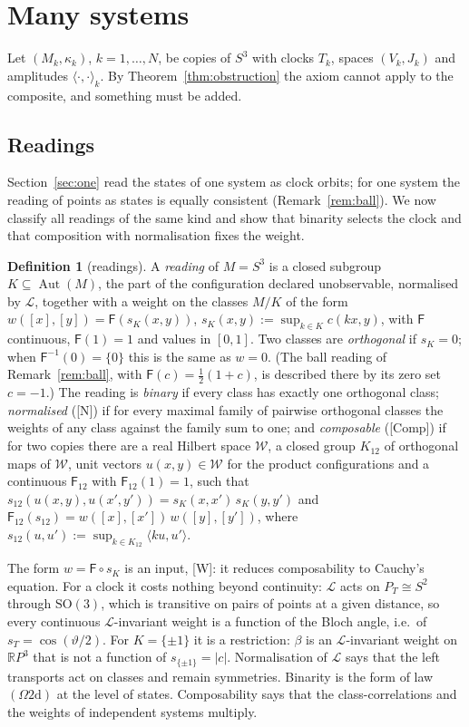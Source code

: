 \documentclass[aps,pra,onecolumn,superscriptaddress,nofootinbib,10pt]{revtex4-2}
\theoremstyle{definition}
\newtheorem{definition}[theorem]{Definition}
\theoremstyle{remark}
\newcommand{\R}{\mathbb{R}}
\newcommand{\cL}{\mathcal{L}}
\newcommand{\Aut}{\operatorname{Aut}}
\newcommand{\ip}[2]{\langle #1,#2\rangle}
\newcommand{\SO}{\mathrm{SO}}
\begin{document}
\section{Many systems}\label{sec:many}
Let $(M_k,\kappa_k)$, $k=1,\dots,N$, be copies of $S^3$ with clocks $T_k$, spaces $(V_k,J_k)$ and
amplitudes $\ip{\cdot}{\cdot}_k$.  By Theorem~\ref{thm:obstruction} the axiom cannot apply to the
composite, and something must be added.

\subsection{Readings}\label{sec:readings}
Section~\ref{sec:one} read the states of one system as clock orbits; for one
system the reading of points as states is equally consistent (Remark~\ref{rem:ball}).  We now classify
all readings of the same kind and show that binarity selects the clock and that composition with
normalisation fixes the weight.

\begin{definition}[readings]\label{def:reading}
A \emph{reading} of $M=S^3$ is a closed subgroup $K\subseteq\Aut(M)$, the part of the configuration
declared unobservable, normalised by $\cL$, together with a weight on the classes $M/K$ of the form
$w([x],[y])=\mathsf F(s_K(x,y))$, $s_K(x,y):=\sup_{k\in K}c(kx,y)$, with $\mathsf F$ continuous, $\mathsf F(1)=1$ and values in
$[0,1]$.  Two classes are \emph{orthogonal} if $s_K=0$; when $\mathsf F^{-1}(0)=\{0\}$ this is the same as $w=0$.  (The
ball reading of Remark~\ref{rem:ball}, with $\mathsf F(c)=\frac12(1+c)$, is described there by its zero set $c=-1$.)  The reading is
\emph{binary} if every class has exactly one orthogonal class;
\emph{normalised} ([N]) if for every maximal family of pairwise orthogonal classes the weights of any
class against the family sum to one; and
\emph{composable} ([Comp]) if for two copies there are a real Hilbert space $\mathcal W$, a closed group $K_{12}$ of
orthogonal maps of $\mathcal W$, unit vectors $u(x,y)\in \mathcal W$ for the product configurations and a continuous
$\mathsf F_{12}$ with $\mathsf F_{12}(1)=1$, such that
$s_{12}(u(x,y),u(x',y'))=s_K(x,x')\,s_K(y,y')$ and $\mathsf F_{12}(s_{12})=w([x],[x'])\,w([y],[y'])$, where
$s_{12}(u,u'):=\sup_{k\in K_{12}}\ip{ku}{u'}$.
\end{definition}
The form $w=\mathsf F\circ s_K$ is an input, [W]: it reduces composability to Cauchy's equation.  For a clock it
costs nothing beyond continuity: $\cL$ acts on $P_T\cong S^2$ through $\SO(3)$, which is transitive on pairs of
points at a given distance, so every continuous $\cL$-invariant weight is a function of the Bloch angle,
i.e.\ of $s_T=\cos(\vartheta/2)$.  For $K=\{\pm1\}$ it is a restriction: $\beta$ is an $\cL$-invariant weight on
$\R P^3$ that is not a function of $s_{\{\pm1\}}=\lvert c\rvert$.
Normalisation of $\cL$ says that the left transports act on classes and remain symmetries.  Binarity is
the form of law $(\Omega2\mathrm d)$ at the level of states.  Composability says that the class-correlations
and the weights of independent systems multiply.
\end{document}
